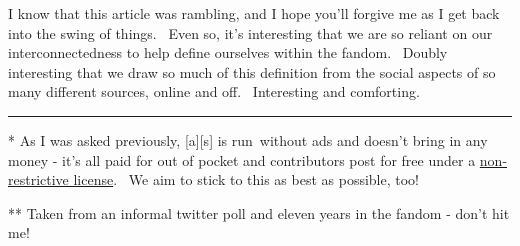 I know that this article was rambling, and I hope you'll forgive me as I
get back into the swing of things. ~Even so, it's interesting that we
are so reliant on our interconnectedness to help define ourselves within
the fandom. ~Doubly interesting that we draw so much of this definition
from the social aspects of so many different sources, online and off.
~Interesting and comforting.

\begin{center}\rule{0.5\linewidth}{\linethickness}\end{center}

* As I was asked previously, {[}a{]}{[}s{]} is run~without ads and
doesn't bring in any money - it's all paid for out of pocket and
contributors post for free under a
\href{http://creativecommons.org/licenses/by-nc-sa/3.0/}{non-restrictive
license}. ~We aim to stick to this as best as possible, too!

** Taken from an informal twitter poll and eleven years in the fandom -
don't hit me!
